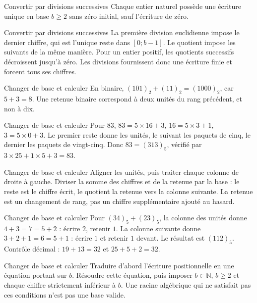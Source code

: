 \documentclass[aspectratio=169,10pt]{beamer}
\begin{document}
\begin{frame}{Convertir par divisions successives}
Chaque entier naturel possède une écriture unique en base \(b\ge2\) sans zéro initial, sauf l’écriture de zéro.
\end{frame}
\begin{frame}{Convertir par divisions successives}
La première division euclidienne impose le dernier chiffre, qui est l’unique reste dans \([0;b-1]\). Le quotient impose les suivants de la même manière. Pour un entier positif, les quotients successifs décroissent jusqu’à zéro. Les divisions fournissent donc une écriture finie et forcent tous ses chiffres.
\end{frame}
\begin{frame}{Changer de base et calculer}
En binaire, \((101)_2+(11)_2=(1000)_2\), car \(5+3=8\). Une retenue binaire correspond à deux unités du rang précédent, et non à dix.
\end{frame}
\begin{frame}{Changer de base et calculer}
Pour \(83\), \(83=5\times16+3\), \(16=5\times3+1\), \(3=5\times0+3\). Le premier reste donne les unités, le suivant les paquets de cinq, le dernier les paquets de vingt-cinq. Donc \(83=(313)_5\), vérifié par \(3\times25+1\times5+3=83\).
\end{frame}
\begin{frame}{Changer de base et calculer}
Aligner les unités, puis traiter chaque colonne de droite à gauche. Diviser la somme des chiffres et de la retenue par la base : le reste est le chiffre écrit, le quotient la retenue vers la colonne suivante. La retenue est un changement de rang, pas un chiffre supplémentaire ajouté au hasard.
\end{frame}
\begin{frame}{Changer de base et calculer}
Pour \((34)_5+(23)_5\), la colonne des unités donne \(4+3=7=5+2\) : écrire \(2\), retenir \(1\). La colonne suivante donne \(3+2+1=6=5+1\) : écrire \(1\) et retenir \(1\) devant. Le résultat est \((112)_5\). Contrôle décimal : \(19+13=32\) et \(25+5+2=32\).
\end{frame}
\begin{frame}{Changer de base et calculer}
Traduire d’abord l’écriture positionnelle en une équation portant sur \(b\). Résoudre cette équation, puis imposer \(b\in\mathbb{N}\), \(b\ge2\) et chaque chiffre strictement inférieur à \(b\). Une racine algébrique qui ne satisfait pas ces conditions n’est pas une base valide.
\end{frame}
\end{document}
